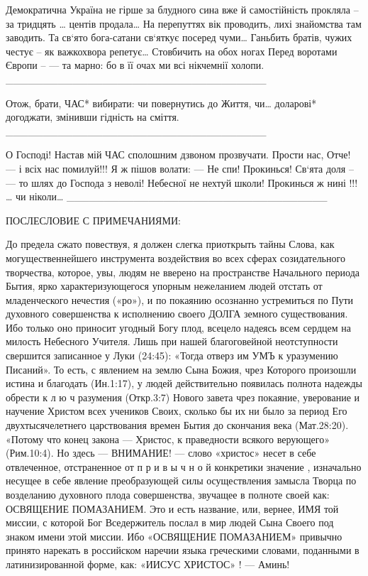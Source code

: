 Демократична Україна
не гірше за блудного сина
вже й самостійність прокляла –
за тридцять … центів продала…
              На перепуттях вік проводить,
              лихі знайомства там заводить.
              Та св‘ято бога-сатани
              св‘яткує посеред чуми…
              Ганьбить братів, чужих честує –
              як важкохвора репетує…
              Стовбичить на обох ногах
              Перед воротами Європи –
              --- та марно:  бо в її очах
              ми всі нікчемнії холопи.
___________________________________

Отож, брати, ЧАС*  вибирати:
чи повернутись до Життя,
чи…  доларові* догоджати,
змінивши гідність на сміття.
___________________________________

              О Господі!  Настав мій  ЧАС
              сполошним дзвоном  прозвучати.
              Прости нас,  Отче!  --- і всіх нас
              помилуй!!!
                Я ж пішов волати:
              --- Не спи!  Прокинься!  Св‘ята доля –
              --- то шлях до  Господа з неволі!
              Небесної не нехтуй школи!
              Прокинься ж нині !!!
                … чи ніколи…
___________________________________


               ПОСЛЕСЛОВИЕ С ПРИМЕЧАНИЯМИ:

     До предела сжато повествуя, я должен слегка приоткрыть тайны Слова, как могущественнейшего инструмента воздействия во всех сферах созидательного творчества, которое, увы, людям не вверено на пространстве Начального периода Бытия, ярко характеризующегося упорным нежеланием людей отстать от младенческого нечестия («ро»), и по покаянию осознанно устремиться по Пути духовного совершенства к исполнению своего ДОЛГА земного существования. Ибо только оно приносит угодный Богу плод, всецело надеясь всем сердцем на милость Небесного Учителя. Лишь при нашей благоговейной неотступности свершится записанное у Луки (24:45): «Тогда отверз им  УМЪ к уразумению Писаний».
То есть, с явлением на землю Сына Божия, чрез Которого произошли истина и благодать (Ин.1:17), у людей действительно появилась полнота надежды обрести  к л ю ч  разумения (Откр.3:7) Нового завета чрез покаяние, уверование и научение Христом всех учеников Своих, сколько бы их ни было за период Его двухтысячелетнего царствования времен Бытия до скончания века (Мат.28:20). «Потому что конец закона --- Христос, к праведности всякого верующего» (Рим.10:4).  Но здесь ---  ВНИМАНИЕ! --- слово «христос» несет в себе отвлеченное, отстраненное от  п р и в ы ч н о й  конкретики значение , изначально несущее в себе явление преобразующей силы осуществления замысла Творца по возделанию духовного плода совершенства, звучащее в полноте своей как: ОСВЯЩЕНИЕ  ПОМАЗАНИЕМ.  Это и есть название, или, вернее, ИМЯ той миссии, с которой Бог Вседержитель послал в мир людей Сына Своего под знаком имени этой миссии. Ибо «ОСВЯЩЕНИЕ ПОМАЗАНИЕМ» привычно принято нарекать в российском наречии языка греческими словами, поданными в латинизированной форме, как:  «ИИСУС ХРИСТОС» ! ---  Аминь!

